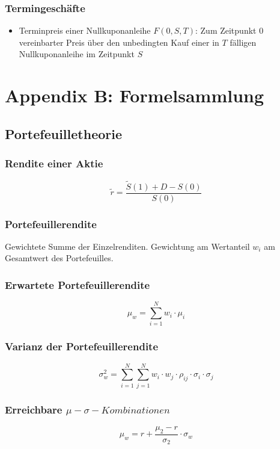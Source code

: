 \subsubsection{Termingeschäfte}
\begin{itemize}
	\item Terminpreis einer Nullkuponanleihe \(F(0, S, T)\): Zum Zeitpunkt \(0\) vereinbarter Preis über den unbedingten Kauf einer in \(T\) fälligen Nullkuponanleihe im Zeitpunkt \(S\)
\end{itemize}



\section{Appendix B: Formelsammlung}

\subsection{Portefeuilletheorie}

\subsubsection{Rendite einer Aktie}
\[\tilde{r} = \frac{\tilde{S} (1) + D - S(0)}{S(0)}\]

\subsubsection{Portefeuillerendite}
Gewichtete Summe der Einzelrenditen. Gewichtung am Wertanteil \(w_i\) am Gesamtwert des Portefeuilles.

\subsubsection{Erwartete Portefeuillerendite}
\[\mu_w = \sum_{i=1}^{N} w_i \cdot \mu_i\]

\subsubsection{Varianz der Portefeuillerendite}
\[\sigma_w^2 = \sum_{i=1}^{N}\sum_{j=1}^{N} w_i \cdot w_j \cdot \rho_{ij} \cdot \sigma_i \cdot \sigma_j\]

\subsubsection{Erreichbare \(\mu-\sigma-Kombinationen\)}
\[\mu_w = r + \frac{\mu_2 - r}{\sigma_2} \cdot \sigma_w \]


